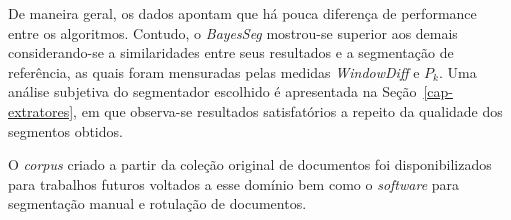 De maneira geral, os dados apontam que há pouca diferença de performance entre os algoritmos. Contudo, o \textit{BayesSeg} mostrou-se superior aos demais considerando-se a similaridades entre seus resultados e a segmentação de referência, as quais foram mensuradas pelas medidas \textit{WindowDiff} e $P_k$.  
Uma análise subjetiva do segmentador escolhido é apresentada na Seção~\ref{cap-extratores}, em que observa-se resultados satisfatórios a repeito da qualidade dos segmentos obtidos. 

O \textit{corpus} criado a partir da coleção original de documentos foi disponibilizados para trabalhos futuros voltados a esse domínio bem como o \textit{software} para segmentação manual e rotulação de documentos. 
































